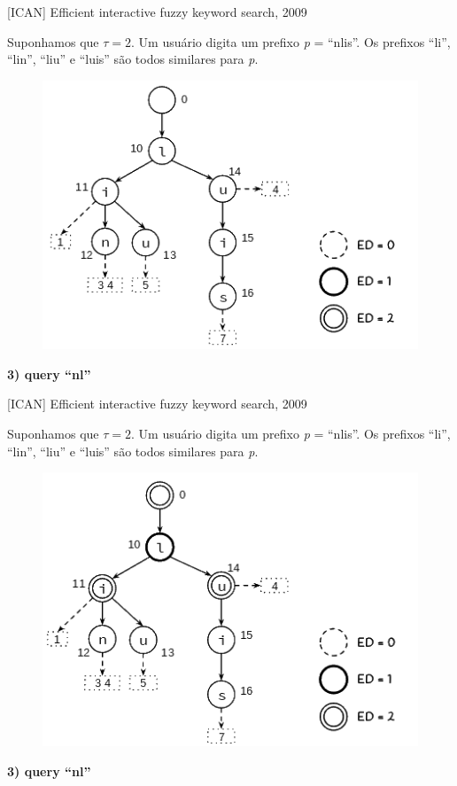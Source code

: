 \documentclass[11pt]{beamer}
\begin{document}
\begin{frame}{[ICAN] Efficient interactive fuzzy keyword search, 2009}

    \small
    Suponhamos que $\tau = 2$. Um usuário digita um prefixo \textit{p} = ``nlis''. Os prefixos ``li'', ``lin'', ``liu'' e ``luis'' são todos similares para \textit{p}.
    
    \begin{figure}
      \includegraphics[scale=0.45]{pictures/ican_default.png}
      \centering
    \end{figure}
    
    \textbf{3) query ``nl''}
    
\end{frame}

\begin{frame}{[ICAN] Efficient interactive fuzzy keyword search, 2009}

    \small
    Suponhamos que $\tau = 2$. Um usuário digita um prefixo \textit{p} = ``nlis''. Os prefixos ``li'', ``lin'', ``liu'' e ``luis'' são todos similares para \textit{p}.
    
    \begin{figure}
      \includegraphics[scale=0.45]{pictures/ican_4.png}
      \centering
    \end{figure}
    
    \textbf{3) query ``nl''}
    
\end{frame}
\end{document}
